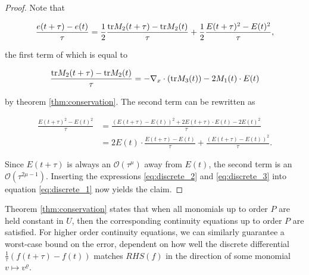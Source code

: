 \begin{proof}
    Note that 

    \begin{equation}\label{eq:discrete_1}
        \frac{e(t + \tau) - e(t)}{\tau} 
        = \frac{1}{2} \frac{\text{tr} M_2 (t + \tau) - \text{tr} M_2 (t)}{\tau} 
            + \frac{1}{2} \frac{E(t + \tau)^2 - E(t)^2}{\tau} ,
    \end{equation}

    the first term of which is equal to 
    
    \begin{equation}\label{eq:discrete_2}
        \frac{\text{tr} M_2 (t + \tau) - \text{tr} M_2 (t)}{\tau} 
        = - \nabla_x \cdot ( \text{tr} M_3 (t) ) - 2 M_1 (t) \cdot E (t)
    \end{equation}

    by theorem 
    \ref{thm:conservation}. The second term can be rewritten as 

    \begin{equation}\label{eq:discrete_3}
        \begin{split}
            \frac{E(t + \tau)^2 - E(t)^2}{\tau} 
            &= \frac{(E(t + \tau) - E(t))^2 + 2 E(t + \tau) \cdot E(t) - 2 E(t)^2}{\tau} \\ 
            &= 2 E(t) \cdot \frac{E(t +\tau) - E(t)}{\tau} 
                + \frac{(E(t + \tau) - E(t))^2}{\tau} . 
        \end{split}
    \end{equation}

    Since $E(t + \tau)$ is always an $\mathcal{O} (\tau^\mu)$ away from $E(t)$, the second 
    term is an $\mathcal{O} (\tau^{2\mu - 1})$. Inserting the expressions 
    \ref{eq:discrete_2} and \ref{eq:discrete_3} into equation \ref{eq:discrete_1} now 
    yields the claim. 
\end{proof}

Theorem \ref{thm:conservation} states that when all monomials up to order $P$ are held 
constant in $U$, then the corresponding continuity equations up to order $P$ are 
satisfied. For higher order continuity equations, we can similarly guarantee a worst-case 
bound on the error, dependent on how well the discrete differential 
$\frac{1}{\tau} (f(t + \tau) - f(t))$ matches $RHS(f)$ in the direction of some monomial 
$v \mapsto v^\varrho$. 


